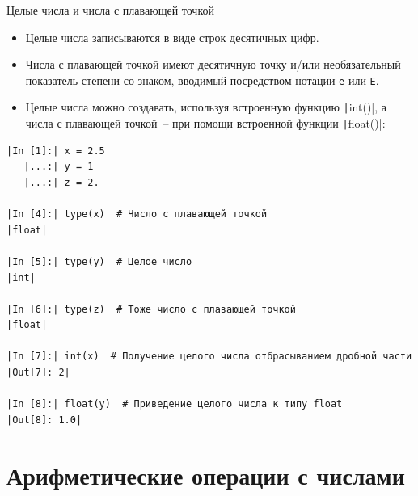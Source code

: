 \documentclass[aspectratio=169, mathserif]{beamer}	%
\begin{document}
\begin{frame}[fragile]{Целые числа и числа с плавающей точкой}
\scriptsize
\begin{itemize}
	\item Целые числа записываются в виде строк десятичных цифр. 
	\item Числа с плавающей точкой имеют десятичную точку и/или необязательный показатель степени со знаком, вводимый посредством нотации \texttt{e} или \texttt{E}.
	\item Целые числа можно создавать, используя встроенную функцию \texttt|int()|, а числа с плавающей точкой~-- при помощи встроенной функции \texttt|float()|:
\end{itemize}
\begin{verbatim}
|In [1]:| x = 2.5
   |...:| y = 1
   |...:| z = 2.

|In [4]:| type(x)  # Число с плавающей точкой
|float|

|In [5]:| type(y)  # Целое число
|int|

|In [6]:| type(z)  # Тоже число с плавающей точкой
|float|

|In [7]:| int(x)  # Получение целого числа отбрасыванием дробной части
|Out[7]: 2|

|In [8]:| float(y)  # Приведение целого числа к типу float
|Out[8]: 1.0|
\end{verbatim}
\vfill
\end{frame}

\section{Арифметические операции с числами}
\sectionframe	%
\end{document}
